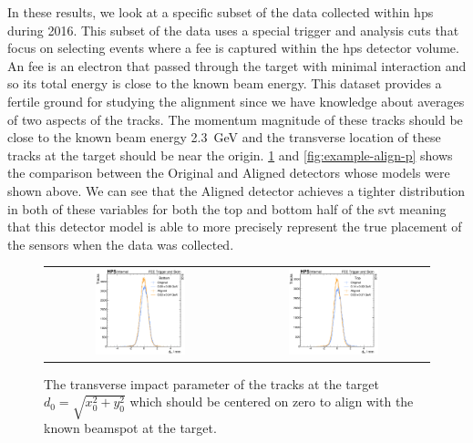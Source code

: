 In these results, we look at a specific subset of the data collected within \ac{hps}
during 2016. This subset of the data uses a special trigger and analysis cuts that
focus on selecting events where a \ac{fee} is captured within the \ac{hps} detector volume.
An \ac{fee} is an electron that passed through the target with minimal interaction and
so its total energy is close to the known beam energy.
This dataset provides a fertile ground for studying the alignment since we have
knowledge about averages of two aspects of the tracks.
The momentum magnitude of these tracks should be close to the known
beam energy \qty{2.3}{\giga\electronvolt} and the transverse location of these tracks
at the target should be near the origin.
\cref{fig:example-align-d0} and \cref{fig:example-align-p} shows the comparison between
the Original and Aligned detectors whose models were shown above.
We can see that the Aligned detector achieves a tighter distribution in both of these
variables for both the top and bottom half of the \ac{svt} meaning that this detector
model is able to more precisely represent the true placement of the sensors when the
data was collected.

\begin{figure}
  \centering
  \begin{tabular}{cc}
    \includegraphics[width=0.49\textwidth]{figures/hps/alignment/d0_bottom.pdf}
    &
    \includegraphics[width=0.49\textwidth]{figures/hps/alignment/d0_top.pdf}
  \end{tabular}
  \caption{The transverse impact parameter of the tracks at the target
  $d_0 = \sqrt{x_0^2+y_0^2}$ which should be centered on zero to align with
  the known beamspot at the target.}
  \label{fig:example-align-d0}
\end{figure}

